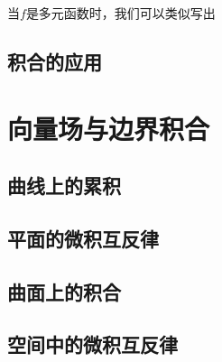 \documentclass[12pt,UTF8,fontset=none]{ctexbook}
\begin{document}
当$f$是多元函数时，我们可以类似写出


\section{积合的应用}

\chapter{向量场与边界积合}

\section{曲线上的累积}

\section{平面的微积互反律}

\section{曲面上的积合}

\section{空间中的微积互反律}
\end{document}
